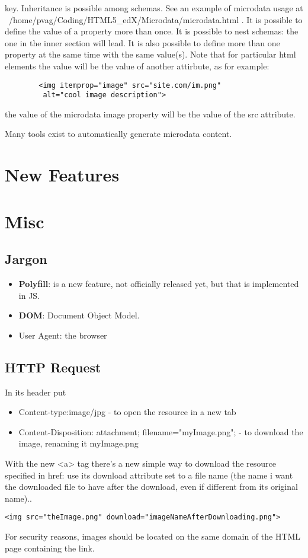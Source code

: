 \documentclass[a4paper,11pt]{book}
\begin{document}
    key. Inheritance is possible among schemas. See an example of microdata usage
    at ~/home/pvag/Coding/HTML5\_edX/Microdata/microdata.html . It is possible to define the value of a property
    more than once. It is possible to nest schemas: the one in the inner section will lead. It is also possible to
    define more than one property at the same time with the same value(s). Note that for particular html elements
    the value will be the value of another attirbute, as for example:
    \begin{verbatim}
        <img itemprop="image" src="site.com/im.png"
         alt="cool image description">
    \end{verbatim}
    the value of the microdata image property will be the value of the src attribute.
    
    Many tools exist to automatically generate microdata content.

\chapter{New Features}

\chapter{Misc}
    \section{Jargon}
    \begin{itemize}
        \item \textbf{Polyfill}: is a new feature, not officially released yet, but that is implemented in JS.
        \item \textbf{DOM}: Document Object Model.
        \item User Agent: the browser
    \end{itemize}
    \section{HTTP Request}
    In its header put
    \begin{itemize}
        \item Content-type:image/jpg - to open the resource in a new tab
        \item Content-Disposition: attachment; filename="myImage.png"; - to download the image, renaming it myImage.png
    \end{itemize}
    With the new <a> tag there's a new simple way to download the resource specified in href: use its download attribute
    set to a file name (the name i want the downloaded file to have after the download, even if different from its original name)..
    \begin{verbatim}<img src="theImage.png" download="imageNameAfterDownloading.png">\end{verbatim}
    For security reasons, images should be located on the same domain of the HTML page containing the link.
\end{document}
